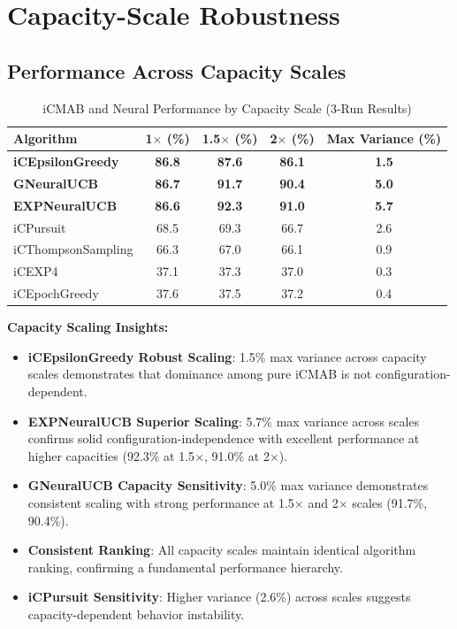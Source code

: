 \documentclass[12pt,a4paper]{article}
\newcommand{\primarytext}[1]{\textcolor{primaryblue}{\textbf{#1}}}
\newcommand{\secondarytext}[1]{\textcolor{secondaryblue}{\textbf{#1}}}
\newcommand{\warning}[1]{\textcolor{warningred}{\textbf{#1}}}
\newcommand{\legacy}[1]{\textcolor{legacycolor}{\textbf{#1}}}
\newcommand{\neural}[1]{\textcolor{neuralcolor}{\textbf{#1}}}
\begin{document}
\section{Capacity-Scale Robustness}

\subsection{Performance Across Capacity Scales}

\begin{table}[H]
\centering
\caption{iCMAB and Neural Performance by Capacity Scale (3-Run Results)}
\label{tab:capacity-scale}
\begin{tabular}{@{}lcccc@{}}
\toprule
\textbf{Algorithm} & \textbf{1$\times$ (\%)} & \textbf{1.5$\times$ (\%)} & \textbf{2$\times$ (\%)} & \textbf{Max Variance (\%)} \\
\midrule
\primarytext{iCEpsilonGreedy}   & \primarytext{86.8} & \primarytext{87.6} & \primarytext{86.1} & \primarytext{1.5} \\
\neural{GNeuralUCB}            & \neural{86.7} & \neural{91.7} & \neural{90.4} & \neural{5.0} \\
\legacy{EXPNeuralUCB}           & \legacy{86.6} & \legacy{92.3} & \legacy{91.0} & \legacy{5.7} \\
iCPursuit                       & 68.5 & 69.3 & 66.7 & 2.6 \\
iCThompsonSampling              & 66.3 & 67.0 & 66.1 & 0.9 \\
iCEXP4                          & 37.1 & 37.3 & 37.0 & 0.3 \\
iCEpochGreedy                   & 37.6 & 37.5 & 37.2 & 0.4 \\
\bottomrule
\end{tabular}
\end{table}

\textbf{Capacity Scaling Insights:}
\begin{itemize}
\item \primarytext{iCEpsilonGreedy Robust Scaling}: 1.5\% max variance across capacity scales demonstrates that dominance among pure iCMAB is not configuration-dependent.
\item \legacy{EXPNeuralUCB Superior Scaling}: 5.7\% max variance across scales confirms solid configuration-independence with excellent performance at higher capacities (92.3\% at 1.5$\times$, 91.0\% at 2$\times$).
\item \neural{GNeuralUCB Capacity Sensitivity}: 5.0\% max variance demonstrates consistent scaling with strong performance at 1.5$\times$ and 2$\times$ scales (91.7\%, 90.4\%).
\item \secondarytext{Consistent Ranking}: All capacity scales maintain identical algorithm ranking, confirming a fundamental performance hierarchy.
\item \warning{iCPursuit Sensitivity}: Higher variance (2.6\%) across scales suggests capacity-dependent behavior instability.
\end{itemize}
\end{document}

